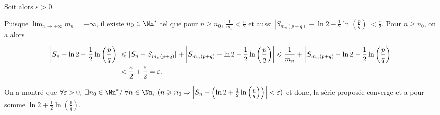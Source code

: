 {{Soit alors $\varepsilon>0$.

Puisque $\lim_{n \rightarrow +\infty}m_n=+\infty$, il existe $n_0\in\Nn^*$ tel que pour $n\geqslant n_0$, $\frac{1}{m_n}<\frac{\varepsilon}{2}$ et aussi $\left|S_{m_n(p+q)}-\ln2-\frac{1}{2}\ln\left(\frac{p}{q}\right)\right|<\frac{\varepsilon}{2}$. Pour $n\geqslant n_0$, on a alors

\begin{align*}\ensuremath
\left|S_{n}-\ln2 -\frac{1}{2}\ln\left(\frac{p}{q}\right)\right|&\leqslant|S_n-S_{m_n(p+q)}|+\left|S_{m_n(p+q)}-\ln2-\frac{1}{2}\ln\left(\frac{p}{q}\right)\right|\leqslant\frac{1}{m_n}+\left|S_{m_n(p+q)}-\ln2-\frac{1}{2}\ln\left(\frac{p}{q}\right)\right|\\
 &<\frac{\varepsilon}{2}+\frac{\varepsilon}{2}=\varepsilon.
\end{align*}

On a montré que $\forall \varepsilon>0,\;\exists n_0\in\Nn^*/\;\forall n\in\Nn,\;(n\geqslant n_0\Rightarrow\left|S_{n}-\left(\ln2 +\frac{1}{2}\ln\left(\frac{p}{q}\right)\right)\right|<\varepsilon)$ et donc, la série proposée converge et a pour somme $\ln2 +\frac{1}{2}\ln\left(\frac{p}{q}\right)$.}
}